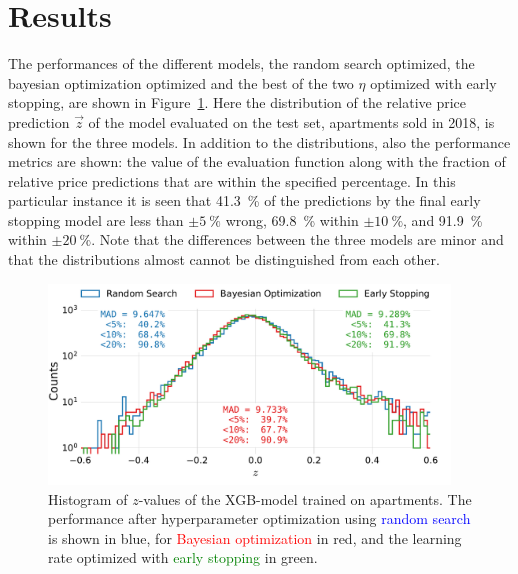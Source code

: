 \FloatBarrier
\section{Results}
\label{sec:h:results}

The performances of the different models, the random search optimized, the bayesian optimization optimized and the best of the two $\eta$ optimized with early stopping, are shown in Figure~\ref{fig:h:CV_res_performance_ejer}. Here the distribution of the relative price prediction $\vec{z}$ of the model evaluated on the test set, apartments sold in \num{2018}, is shown for the three models. In addition to the distributions, also the performance metrics are shown: the value of the evaluation function along with the fraction of relative price predictions that are within the specified percentage. In this particular instance it is seen that \SI{41.3}{\percent} of the predictions by the final early stopping model are less than $\pm\SI{5}{\percent}$ wrong, \SI{69.8}{\percent} within $\pm\SI{10}{\percent}$, and \SI{91.9}{\percent} within $\pm\SI{20}{\percent}$. Note that the differences between the three models are minor and that the distributions almost cannot be distinguished from each other. 

\begin{figure}[h!]
  \includegraphics[width=0.95\textwidth, trim=0 0 0 0, clip]{figures/housing/Ejerlejlighed_v19_cut_all_Ncols_all_xgb_z_hist_metrics.pdf}
  \caption[Performance of XGB-model on apartment prices]
          {Histogram of $z$-values of the XGB-model trained on apartments. The performance after hyperparameter optimization using \textcolor{blue}{random search} is shown in blue, for \textcolor{red}{Bayesian optimization} in red, and the learning rate optimized with \textcolor{green}{early stopping} in green.
          } 
  \label{fig:h:CV_res_performance_ejer}
\end{figure}

